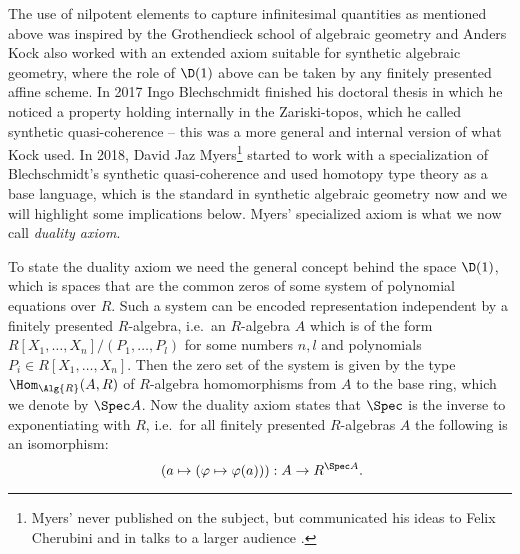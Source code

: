The use of nilpotent elements to capture infinitesimal quantities as mentioned above was inspired by the Grothendieck school of algebraic geometry and Anders Kock also worked with an extended axiom \cite{Kock74,kockreyes} suitable for synthetic algebraic geometry, where the role of $\D(1)$ above can be taken by any finitely presented affine scheme. In 2017 Ingo Blechschmidt finished his doctoral thesis in which he noticed a property holding internally in the Zariski-topos, which he called synthetic quasi-coherence -- this was a more general and internal version of what Kock used. In 2018, David Jaz Myers\footnote{Myers' never published on the subject, but communicated his ideas to Felix Cherubini and in talks to a larger audience \cite{myers-talk1,myers-talk2}.} started to work with a specialization of Blechschmidt's synthetic quasi-coherence and used homotopy type theory as a base language, which is the standard in synthetic algebraic geometry now and we will highlight some implications below. Myers' specialized axiom is what we now call \emph{duality axiom}.

To state the duality axiom we need the general concept behind the space $\D(1)$, which is spaces that are the common zeros of some system of polynomial equations over $R$. Such a system can be encoded representation independent by a finitely presented $R$-algebra, i.e.\ an $R$-algebra $A$ which is of the form $R[X_1,\dots,X_n]/(P_1,\dots,P_l)$ for some numbers $n,l$ and polynomials $P_i\in R[X_1,\dots,X_n]$.
Then the zero set of the system is given by the type $\Hom_{\Alg{R}}(A,R)$ of $R$-algebra homomorphisms from $A$ to the base ring, which we denote by $\Spec A$.
Now the duality axiom states that $\Spec$ is the inverse to exponentiating with $R$, i.e.\ for all 
finitely presented $R$-algebras $A$ the following is an isomorphism:
\[ (a\mapsto (\varphi\mapsto \varphi(a))) : A\to R^{\Spec A}\rlap{.}\]

